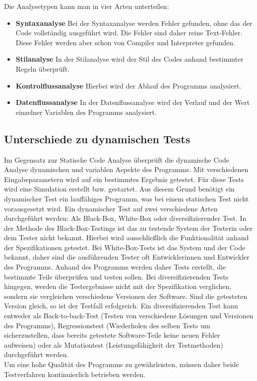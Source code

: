 Die Analysetypen kann man in vier Arten unterteilen:
\begin{itemize}
\item \textbf{Syntaxanalyse}
Bei der Syntaxanalyse werden Fehler gefunden, ohne das der Code vollständig ausgeführt wird. Die Fehler sind daher reine Text-Fehler. Diese Fehler werden aber schon von Compiler und Interpreter gefunden.
\item \textbf{Stilanalyse}
In der Stilanalyse wird der Stil des Codes anhand bestimmter Regeln überprüft.
\item \textbf{Kontrolflussanalyse}
Hierbei wird der Ablauf des Programms analysiert.
\item \textbf{Datenflussanalyse}
In der Datenflussanalyse wird der Verlauf und der Wert einzelner Variablen des Programms analysiert.
\end{itemize}

\subsection{Unterschiede zu dynamischen Tests}
Im Gegensatz zur Statische Code Analyse überprüft die dynamische Code Analyse dynamischen und variablen Aspekte des Programms. Mit verschiedenen Eingabeparametern wird auf ein bestimmtes Ergebnis getestet. \cite{grigorenkoDynTest} Für diese Tests wird eine Simulation erstellt bzw. gestartet. Aus diesem Grund benötigt ein dynamischer Test ein lauffähiges Programm, was bei einem statischen Test nicht vorausgesetzt wird. Ein dynamischer Test auf zwei verschiedene Arten durchgeführt werden: Als Black-Box, White-Box oder diversifizierender Test.
In der Methode des Black-Box-Testings ist das zu testende System der Testerin oder dem Tester nicht bekannt. Hierbei wird ausschließlich die Funktionalität anhand der Spezifikationen getestet. Bei White-Box-Tests ist das System und der Code bekannt, daher sind die ausführenden Tester oft Entwicklerinnen und Entwickler des Programms. Anhand des Programms werden daher Tests erstellt, die bestimmte Teile überprüfen und testen sollen. Bei diversifizierenden Tests hingegen, werden die Testergebnisse nicht mit der Spezifikation verglichen, sondern sie vergleichen verschiedene Versionen der Software. Sind die getesteten Version gleich, so ist der Testfall erfolgreich. Ein diversifizierenden Test kann entweder als Back-to-back-Test (Testen von verschiedene Lösungen und Versionen des Programms), Regressionstest (Wiederholen des selben Tests um sicherzustellen, dass bereits getestete Software-Teile keine neuen Fehler aufweisen) oder als Mutationtest (Leistungsfähigkeit der Testmethoden) durchgeführt werden. \parencite{bommer2016softwarewartung}
\\
Um eine hohe Qualität des Programms zu gewährleisten, müssen daher beide Testverfahren kontinuierlich betrieben werden.
